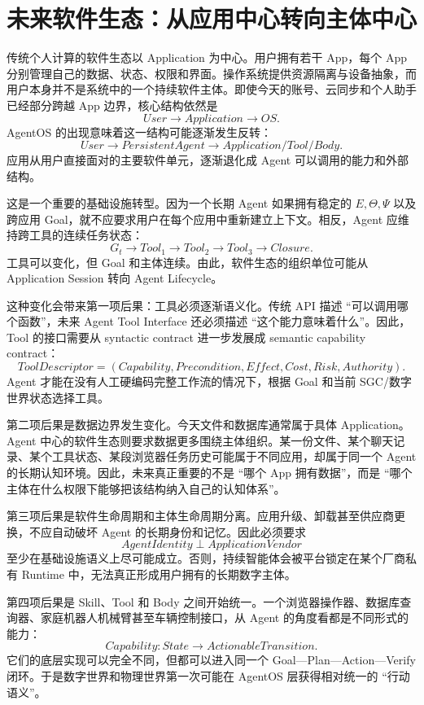 \section{未来软件生态：从应用中心转向主体中心}

传统个人计算的软件生态以 Application 为中心。用户拥有若干 App，每个 App 分别管理自己的数据、状态、权限和界面。操作系统提供资源隔离与设备抽象，而用户本身并不是系统中的一个持续软件主体。即使今天的账号、云同步和个人助手已经部分跨越 App 边界，核心结构依然是
\[
User
\rightarrow
Application
\rightarrow
OS.
\]
AgentOS 的出现意味着这一结构可能逐渐发生反转：
\[
User
\rightarrow
PersistentAgent
\rightarrow
Application/Tool/Body.
\]
应用从用户直接面对的主要软件单元，逐渐退化成 Agent 可以调用的能力和外部结构。

这是一个重要的基础设施转型。因为一个长期 Agent 如果拥有稳定的 $E,\Theta,\Psi$ 以及跨应用 Goal，就不应要求用户在每个应用中重新建立上下文。相反，Agent 应维持跨工具的连续任务状态：
\[
G_t
\rightarrow
Tool_1
\rightarrow
Tool_2
\rightarrow
Tool_3
\rightarrow
Closure.
\]
工具可以变化，但 Goal 和主体连续。由此，软件生态的组织单位可能从 Application Session 转向 Agent Lifecycle。

这种变化会带来第一项后果：工具必须逐渐语义化。传统 API 描述 ``可以调用哪个函数''，未来 Agent Tool Interface 还必须描述 ``这个能力意味着什么''。因此，Tool 的接口需要从 syntactic contract 进一步发展成 semantic capability contract：
\[
ToolDescriptor
=
(
Capability,
Precondition,
Effect,
Cost,
Risk,
Authority
).
\]
Agent 才能在没有人工硬编码完整工作流的情况下，根据 Goal 和当前 SGC/数字世界状态选择工具。

第二项后果是数据边界发生变化。今天文件和数据库通常属于具体 Application。Agent 中心的软件生态则要求数据更多围绕主体组织。某一份文件、某个聊天记录、某个工具状态、某段浏览器任务历史可能属于不同应用，却属于同一个 Agent 的长期认知环境。因此，未来真正重要的不是 ``哪个 App 拥有数据''，而是 ``哪个主体在什么权限下能够把该结构纳入自己的认知体系''。

第三项后果是软件生命周期和主体生命周期分离。应用升级、卸载甚至供应商更换，不应自动破坏 Agent 的长期身份和记忆。因此必须要求
\[
AgentIdentity
\perp
ApplicationVendor
\]
至少在基础设施语义上尽可能成立。否则，持续智能体会被平台锁定在某个厂商私有 Runtime 中，无法真正形成用户拥有的长期数字主体。

第四项后果是 Skill、Tool 和 Body 之间开始统一。一个浏览器操作器、数据库查询器、家庭机器人机械臂甚至车辆控制接口，从 Agent 的角度看都是不同形式的能力：
\[
Capability:
State
\rightarrow
ActionableTransition.
\]
它们的底层实现可以完全不同，但都可以进入同一个 Goal—Plan—Action—Verify 闭环。于是数字世界和物理世界第一次可能在 AgentOS 层获得相对统一的 ``行动语义''。

